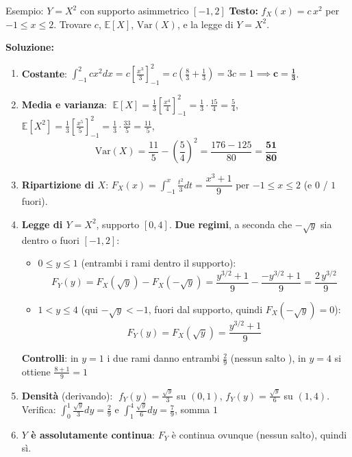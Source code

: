 \documentclass[12pt]{extarticle} %
\begin{document}
\begin{eserciziobox}{{Esempio: $Y = X^2$ con supporto asimmetrico $[-1,2]$}}
\textbf{Testo:} $f_X(x) = c\,x^2$ per $-1 \le x \le 2$. Trovare $c$, $\mathbb{E}[X]$, $\mathrm{Var}(X)$, e la legge di $Y = X^2$.
\par\textbf{Soluzione:}
\begin{enumerate}
    \item \textbf{Costante}: $\int_{-1}^{2} c x^2 dx = c\left[\frac{x^3}{3}\right]_{-1}^{2} = c\left(\frac83 + \frac13\right) = 3c = 1 \implies \mathbf{c = \frac13}$.
    \item \textbf{Media e varianza}: $\;\mathbb{E}[X] = \frac13\left[\frac{x^4}{4}\right]_{-1}^2 = \frac13 \cdot \frac{15}{4} = \frac54$, \quad $\mathbb{E}[X^2] = \frac13\left[\frac{x^5}{5}\right]_{-1}^2 = \frac13 \cdot \frac{33}{5} = \frac{11}{5}$,
    $$ \mathrm{Var}(X) = \frac{11}{5} - \left(\frac54\right)^2 = \frac{176 - 125}{80} = \mathbf{\frac{51}{80}} $$
    \item \textbf{Ripartizione di $X$}: $F_X(x) = \int_{-1}^{x}\frac{t^2}{3}dt = \dfrac{x^3+1}{9}$ per $-1 \le x \le 2$ (e $0$ / $1$ fuori).
    \item \textbf{Legge di $Y = X^2$}, supporto $[0,4]$. \textbf{Due regimi}, a seconda che $-\sqrt y$ sia dentro o fuori $[-1,2]$:
    \begin{itemize}[-]
        \item \textbf{$0 \le y \le 1$} (entrambi i rami dentro il supporto):
        $$ F_Y(y) = F_X(\sqrt y) - F_X(-\sqrt y) = \frac{y^{3/2}+1}{9} - \frac{-y^{3/2}+1}{9} = \frac{2\,y^{3/2}}{9} $$
        \item \textbf{$1 < y \le 4$} (qui $-\sqrt y < -1$, fuori dal supporto, quindi $F_X(-\sqrt y) = 0$):
        $$ F_Y(y) = F_X(\sqrt y) = \frac{y^{3/2}+1}{9} $$
    \end{itemize}
    \textbf{Controlli}: in $y=1$ i due rami danno entrambi $\frac29$ (nessun salto \checkmark), in $y=4$ si ottiene $\frac{8+1}{9} = 1$ \checkmark
    \item \textbf{Densità} (derivando): $\;f_Y(y) = \frac{\sqrt y}{3}$ su $(0,1)$, \; $f_Y(y) = \frac{\sqrt y}{6}$ su $(1,4)$. \\ Verifica: $\int_0^1 \frac{\sqrt y}{3} dy = \frac29$ e $\int_1^4 \frac{\sqrt y}{6}dy = \frac79$, somma $1$ \checkmark
    \item \textbf{$Y$ è assolutamente continua}: $F_Y$ è continua ovunque (nessun salto), quindi sì.
\end{enumerate}
\end{eserciziobox}
\end{document}
